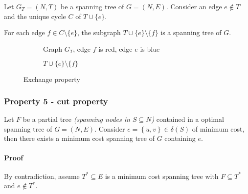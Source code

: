 \documentclass[english]{article}
\begin{document}
Let \(G_T = (N, T)\) be a spanning tree of \(G = (N, E)\).
Consider an edge \(e \notin T\) and the unique cycle \(C\) of \(T \cup \{e\}\).

For each edge \(f \in C \setminus \{e\}\), the subgraph \(T \cup \{e\} \setminus \{f\}\) is a spanning tree of \(G\).

\begin{figure}[htbp]
  \centering
  \bigskip
  \begin{subfigure}[t]{0.495\textwidth}
    \centering
    \caption{Graph \(G_T\), edge \(f\) is red, edge \(e\) is blue}
  \end{subfigure}
  \begin{subfigure}[t]{0.495\textwidth}
    \centering
    \caption{\(T \cup \{e\} \setminus \{f\}\)}
  \end{subfigure}
  \caption{Exchange property}
  \label{fig:exchange-property}
  \bigskip
\end{figure}

\subsubsection{Property 5 - cut property}

Let \(F\) be a partial tree \textit{(spanning nodes in \(S \subseteq N\))} contained in a optimal spanning tree of \(G = (N, E)\).
Consider \(e = \left\{u, v\right\} \in \delta(S)\) of minimum cost, then there exists a minimum cost spanning tree of \(G\) containing \(e\).

\paragraph{Proof}

By contradiction, assume \(T^\ast \subseteq E\) is a minimum cost spanning tree with \(F \subseteq T^\ast\) and \(e \notin T^\ast\).
\end{document}
